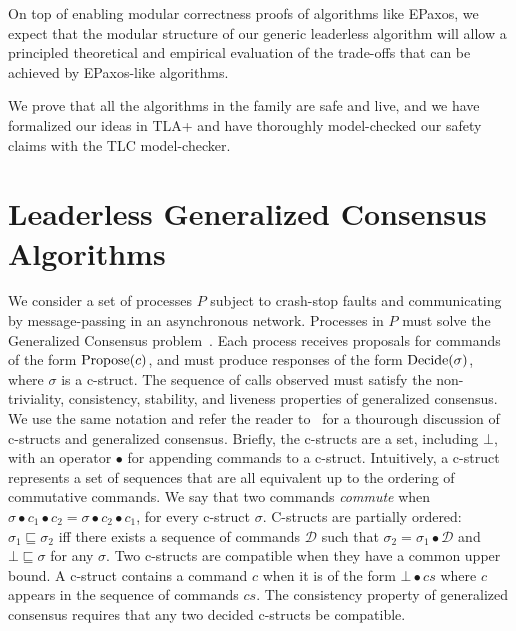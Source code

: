 On top of enabling modular correctness proofs of algorithms like EPaxos, we expect that the modular structure of our generic leaderless algorithm will allow a principled theoretical and empirical evaluation of the trade-offs that can be achieved by EPaxos-like algorithms.

We prove that all the algorithms in the family are safe and live, and we have formalized our ideas in TLA+ and have thoroughly model-checked our safety claims with the TLC model-checker.

\section{Leaderless Generalized Consensus Algorithms}

We consider a set of processes $P$ subject to crash-stop faults and communicating by message-passing in an asynchronous network. Processes in $P$ must solve the Generalized Consensus problem~\cite{Lamport05GeneralizeConsensus}. Each process receives proposals for commands of the form $\operatorname{Propose}(c)$, and must produce responses of the form $\operatorname{Decide}(\sigma)$, where $\sigma$ is a c-struct. 
The sequence of calls observed must satisfy the non-triviality, consistency, stability, and liveness properties of generalized consensus.
We use the same notation and refer the reader to~\cite{Lamport05GeneralizeConsensus} for a thourough discussion of c-structs and generalized consensus. Briefly, the c-structs are a set, including $\bot$, with an operator $\bullet$ for appending commands to a c-struct. Intuitively, a c-struct represents a set of sequences that are all equivalent up to the ordering of commutative commands.
We say that two commands \textit{commute} when $\sigma\bullet c_1\bullet c_2 =  \sigma\bullet c_2\bullet c_1 $, for every c-struct $\sigma$.
C-structs are partially ordered: $\sigma_1\sqsubseteq \sigma_2$ iff there exists a sequence of commands $\mathcal{D}$ such that $\sigma_2 = \sigma_1\bullet \mathcal{D}$ and $\bot\sqsubseteq \sigma$ for any
$\sigma$. Two c-structs are compatible when they have a
common upper bound. A c-struct contains a command $c$ when it is of the form $\bot\bullet cs$ where $c$ appears in the sequence of commands $cs$. The consistency property of generalized consensus requires that any two decided c-structs be compatible.

